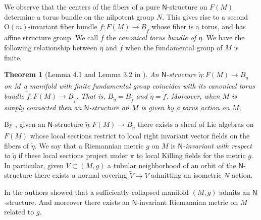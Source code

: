 \documentclass[12pt,a4paper,reqno]{amsart}
\newtheorem{theorem}{Theorem}[section]
\theoremstyle{definition}
\numberwithin{equation}{section}
\newcommand{\Ns}{\mathsf{N}}
\newcommand{\Or}{\mathrm{O}}
\begin{document}
We observe that the centers of the fibers of a pure $\Ns$-structure on $F(M)$ determine a torus bundle on the nilpotent group $N$. This gives rise to a second $\Or(m)$-invariant fiber bundle $\tilde{f}\colon F(M)\to B_{\tilde{f}}$ whose fiber is a torus, and has affine structure group. We call $\tilde{f}$ the \emph{canonical torus bundle of $\tilde{\eta}$}. We have the following relationship between $\tilde{\eta}$ and $\tilde{f}$ when the fundamental group of $M$ is finite.

\begin{theorem}[Lemma 4.1 and Lemma 3.2 in \cite{Rong1996}]\th\label{T: N-structure over manifold with finite fundamental group are given by T-structure}
An $\Ns$-structure $\tilde{\eta}\colon F(M)\to B_{\tilde{\eta}}$ on $M$ a manifold with finite fundamental group coincides with its canonical torus bundle $\tilde{f}\colon F(M)\to B_{\tilde{f}}$. That is, $B_{\tilde{\eta}} = B_{\tilde{f}}$ and $\tilde{\eta}=\tilde{f}$. Moreover, when $M$ is simply connected then an $\Ns$-structure on $M$ is given by a torus action on $M$.
\end{theorem}

By \cite{CheegerFukayaGromov1992}, given an $\Ns$-structure $\tilde{\eta}\colon F(M)\to B_{\tilde{\eta}}$ there exists a sheaf of Lie algebras on $F(M)$ whose local sections restrict to local right invariant vector fields on the fibers of $\tilde{\eta}$. We say that a Riemannian metric $g$ on $M$ is \emph{$\Ns$-invariant with respect to $\tilde{\eta}$} if these local sections  project under $\pi$ to local Killing fields for the metric $g$. In particular, given $V\subset (M,g)$ a tubular neighborhood of  an orbit of the $\Ns$-structure there exists a normal covering $\widetilde{V}\to V$	admitting an isometric $N$-action.
 
In \cite{CheegerFukayaGromov1992} the authors showed that a sufficiently collapsed manifold $(M,g)$ admits an $\Ns$-structure. And moreover there exists an $\Ns$-invariant Riemannian metric on $M$ related to $g$. 
\end{document}
